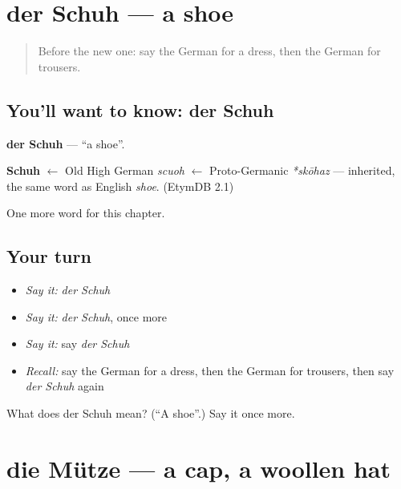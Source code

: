 \section[der Schuh]{der Schuh — a shoe}

\label{lesson:GE-C99-schuh}



\begin{quote}
Before the new one: say the German for a dress, then the German for trousers.
\end{quote}

\subsection*{You'll want to know: der Schuh}
\textbf{der Schuh} — \textquotedblleft{}a shoe\textquotedblright{}.

\begin{cousinweb}
\textbf{Schuh} $\leftarrow$ Old High German \emph{scuoh} $\leftarrow$ Proto-Germanic \emph{*skōhaz} — inherited, the same word as English \emph{shoe}. (EtymDB 2.1)
\end{cousinweb}

\begin{grammarlens}[title={What you've built}]
One more word for this chapter.
\end{grammarlens}

\subsection*{Your turn}
\begin{itemize}
\raggedright
  \item \emph{Say it:} \emph{der Schuh}
  \item \emph{Say it:} \emph{der Schuh}, once more
  \item \emph{Say it:} say \emph{der Schuh}
  \item \emph{Recall:} say the German for a dress, then the German for trousers, then say \emph{der Schuh} again
\end{itemize}

\begin{tcolorbox}[breakable,colback=teal!4,colframe=teal!35!black,title={Before you move on}]
What does der Schuh mean? (\textquotedblleft{}A shoe\textquotedblright{}.) Say it once more.
\end{tcolorbox}
\section[die Mütze]{die Mütze — a cap, a woollen hat}

